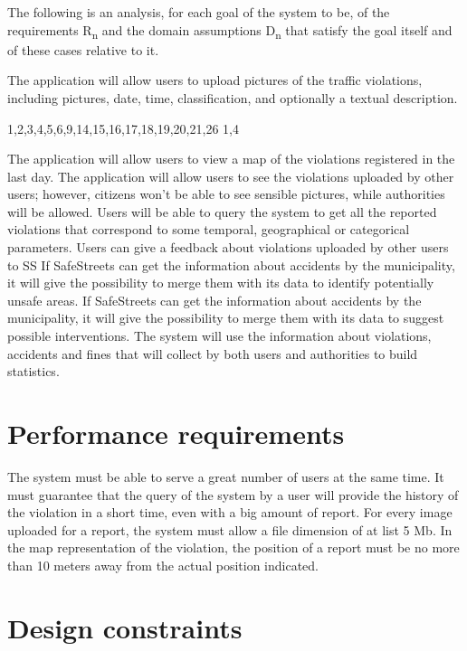 \documentclass[../RASD.tex]{subfiles}
\begin{document}
    The following is an analysis, for each goal of the system to be, of the requirements R\textsubscript{n} and the domain assumptions D\textsubscript{n} that satisfy the goal itself and of these cases relative to it.
    \begin{enumerate}
         The application will allow users to upload pictures of the traffic violations, including pictures, date, time, classification, and optionally a textual description.
            \begin{enumerate}
                \requirement{} 1,2,3,4,5,6,9,14,15,16,17,18,19,20,21,26
                \assumption{} 1,4
            \end{enumerate}
         The application will allow users to view a map of the violations registered in the last day.
         The application will allow users to see the violations uploaded by other users; however, citizens won’t be able to see sensible pictures, while authorities will be allowed.
         Users will be able to query the system to get all the reported violations that correspond to some temporal, geographical or categorical parameters.
         Users can give a feedback about violations uploaded by other users to SS
         If SafeStreets can get the information about accidents by the municipality, it will give the possibility to merge them with its data to identify potentially unsafe areas.
         If SafeStreets can get the information about accidents by the municipality, it will give the possibility to merge them with its data to suggest possible interventions.
         The system will use the information about violations, accidents and fines that will collect by both users and authorities to build statistics.
    \end{enumerate}
        \section{Performance requirements}\label{sec:performance-requirements}
    The system must be able to serve a great number of users at the same time. It must guarantee that the query of the system by a user will provide the history of the violation in a short time, even with a big amount of report. For every image uploaded for a report, the system must allow a file dimension of at list 5 Mb. In the map representation of the violation, the position of a report must be no more than 10 meters away from the actual position indicated.
    \section{Design constraints}\label{sec:design-constraints}
\end{document}

